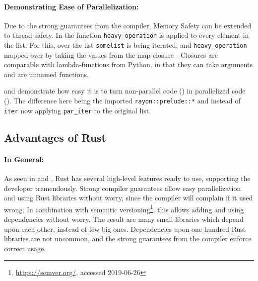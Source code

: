 

\newpage
\paragraph{Demonstrating Ease of Parallelization:}\label{demo:par}

Due to the strong guarantees from the compiler, Memory Safety can be extended
to thread safety. In  the function \verb|heavy_operation| is
applied to every element in the list. For this, over the list \verb|somelist|
is being iterated, and \verb|heavy_operation| mapped over by taking the values
from the map-closure - Closures are comparable with lambda-functions from
Python, in that they can take arguments and are unnamed functions.

 and  demonstrate how easy it is to turn
non-parallel code () in parallelized code ().
The difference here being the imported \verb|rayon::prelude::*| and instead of
\verb|iter| now applying \verb|par_iter| to the original list.





\subsection{Advantages of Rust}\label{sec:RustAdvantages}


\paragraph{In General:} As seen in  and
, Rust has several high-level features ready to use,
supporting the developer tremendously. Strong compiler guarantees allow easy
parallelization and using Rust libraries without worry, since the compiler will
complain if it used wrong. In combination with semantic
versioning\footnote{\url{https://semver.org/}, accessed 2019-06-26}, this
allows adding and using dependencies without worry. The result are many small
libraries which depend upon each other, instead of few big ones. Dependencies
upon one hundred Rust libraries are not uncommon, and the strong guarantees
from the compiler enforce correct usage.

